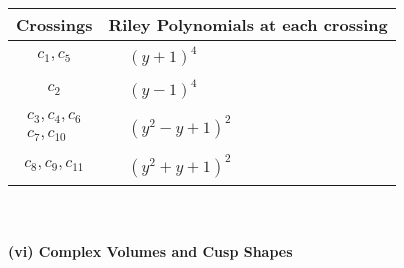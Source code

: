 \documentclass[1p]{elsarticle_modified}
\theoremstyle{definition}
\begin{document}
\begin{tabular}{m{50pt}|m{274pt}}
Crossings & \hspace{64pt}Riley Polynomials at each crossing \\
\hline $$\begin{aligned}c_{1},c_{5}\end{aligned}$$&$\begin{aligned}
&(y+1)^4
\end{aligned}$\\
\hline $$\begin{aligned}c_{2}\end{aligned}$$&$\begin{aligned}
&(y-1)^4
\end{aligned}$\\
\hline $$\begin{aligned}c_{3},c_{4},c_{6}\\c_{7},c_{10}\end{aligned}$$&$\begin{aligned}
&(y^2- y+1)^2
\end{aligned}$\\
\hline $$\begin{aligned}c_{8},c_{9},c_{11}\end{aligned}$$&$\begin{aligned}
&(y^2+y+1)^2
\end{aligned}$\\
\hline
\end{tabular}\\~\\
\newpage\flushleft \textbf{(vi) Complex Volumes and Cusp Shapes}
\end{document}
